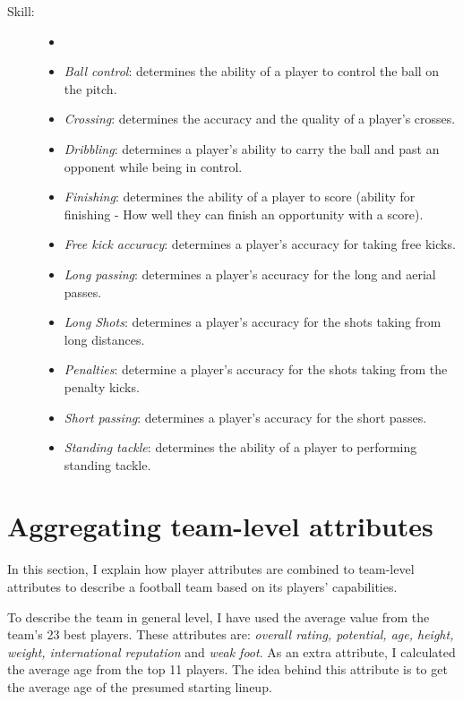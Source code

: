 \begin{description}
\begin{itemize}
    \end{itemize}
    \item[Skill:]
    \begin{itemize}
        \itemsep0.3em
        \item[]
        \item{\textit{Ball control}:} determines the ability of a player to control the ball on the pitch.
        \item{\textit{Crossing}:} determines the accuracy and the quality of a player's crosses.
        \item{\textit{Dribbling}:} determines a player's ability to carry the ball and past an opponent while being in control.
        \item{\textit{Finishing}:} determines the ability of a player to score (ability for finishing - How well they can finish an opportunity with a score).
        \item{\textit{Free kick accuracy}:} determines a player's accuracy for taking free kicks.
        \item{\textit{Long passing}:} determines a player's accuracy for the long and aerial passes.
        \item{\textit{Long Shots}:} determines a player's accuracy for the shots taking from long distances.
        \item{\textit{Penalties}:} determine a player's accuracy for the shots taking from the penalty kicks.
        \item{\textit{Short passing}:} determines a player's accuracy for the short passes.
        \item{\textit{Standing tackle}:} determines the ability of a player to performing standing tackle.

    \end{itemize}

\end{description}

\section{Aggregating team-level attributes}
In this section, I explain how player attributes are combined to team-level attributes to describe a football team based on its players' capabilities.

To describe the team in general level, I have used the average value from the team's 23 best players. These attributes are: \textit{overall rating, potential, age, height, weight, international reputation} and \textit{weak foot}. As an extra attribute, I calculated the average age from the top 11 players. The idea behind this attribute is to get the average age of the presumed starting lineup.


